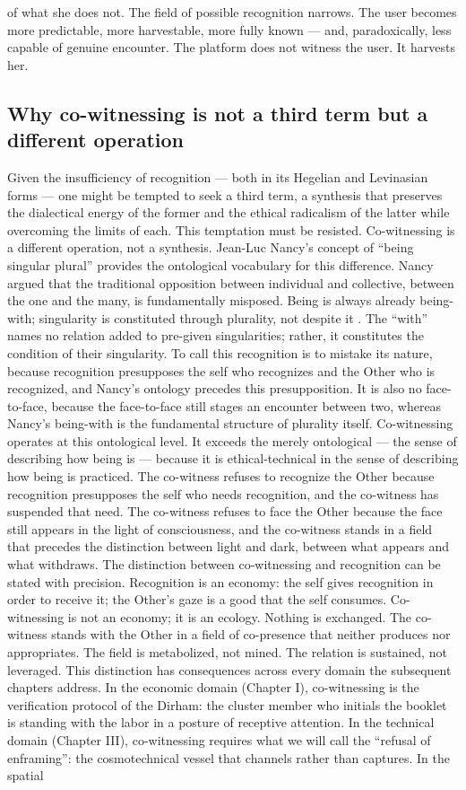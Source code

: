 of what she does not. The field of possible recognition narrows. The user becomes more predictable, more harvestable, more fully known — and, paradoxically, less capable of genuine encounter. The platform does not witness the user. It harvests her.

\subsection{Why co-witnessing is not a third term but a different operation}

Given the insufficiency of recognition --- both in its Hegelian and Levinasian forms --- one might be tempted to seek a third term, a synthesis that preserves the dialectical energy of the former and the ethical radicalism of the latter while overcoming the limits of each. This temptation must be resisted. Co-witnessing is a different operation, not a synthesis. Jean-Luc Nancy’s concept of “being singular plural” provides the ontological vocabulary for this difference. Nancy argued that the traditional opposition between individual and collective, between the one and the many, is fundamentally misposed. Being is always already being-with; singularity is constituted through plurality, not despite it \cite[pp.~1--15]{nancy_1996}. The “with” names no relation added to pre-given singularities; rather, it constitutes the condition of their singularity. To call this recognition is to mistake its nature, because recognition presupposes the self who recognizes and the Other who is recognized, and Nancy’s ontology precedes this presupposition. It is also no face-to-face, because the face-to-face still stages an encounter between two, whereas Nancy’s being-with is the fundamental structure of plurality itself. Co-witnessing operates at this ontological level. It exceeds the merely ontological — the sense of describing how being is — because it is ethical-technical in the sense of describing how being is practiced. The co-witness refuses to recognize the Other because recognition presupposes the self who needs recognition, and the co-witness has suspended that need. The co-witness refuses to face the Other because the face still appears in the light of consciousness, and the co-witness stands in a field that precedes the distinction between light and dark, between what appears and what withdraws. The distinction between co-witnessing and recognition can be stated with precision. Recognition is an economy: the self gives recognition in order to receive it; the Other’s gaze is a good that the self consumes. Co-witnessing is not an economy; it is an ecology. Nothing is exchanged. The co-witness stands with the Other in a field of co-presence that neither produces nor appropriates. The field is metabolized, not mined. The relation is sustained, not leveraged. This distinction has consequences across every domain the subsequent chapters address. In the economic domain (Chapter I), co-witnessing is the verification protocol of the Dirham: the cluster member who initials the booklet is standing with the labor in a posture of receptive attention. In the technical domain (Chapter III), co-witnessing requires what we will call the “refusal of enframing”: the cosmotechnical vessel that channels rather than captures. In the spatial 
